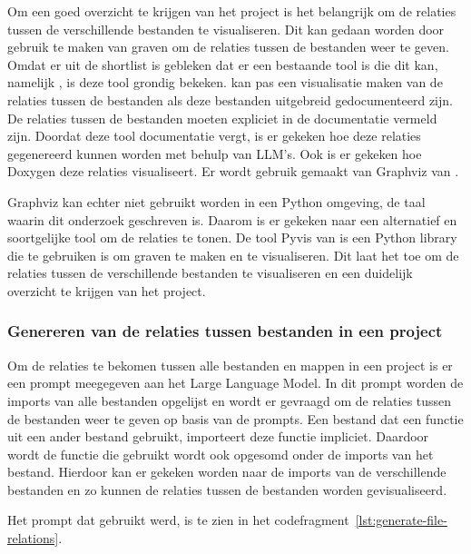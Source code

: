 Om een goed overzicht te krijgen van het project is het belangrijk om de relaties tussen de verschillende bestanden te visualiseren.
Dit kan gedaan worden door gebruik te maken van graven om de relaties tussen de bestanden weer te geven.
Omdat er uit de shortlist is gebleken dat er een bestaande tool is die dit kan, namelijk \textcite{Doxygen2023}, is deze tool grondig bekeken.
\textcite{Doxygen2023} kan pas een visualisatie maken van de relaties tussen de bestanden als deze bestanden uitgebreid gedocumenteerd zijn. 
De relaties tussen de bestanden moeten expliciet in de documentatie vermeld zijn.
Doordat deze tool documentatie vergt, is er gekeken hoe deze relaties gegenereerd kunnen worden met behulp van LLM's.
Ook is er gekeken hoe Doxygen deze relaties visualiseert. Er wordt gebruik gemaakt van Graphviz van \textcite{GraphvizAuthors2024}.

Graphviz \autocite{GraphvizAuthors2024} kan echter niet gebruikt worden in een Python omgeving, de taal waarin dit onderzoek geschreven is.
Daarom is er gekeken naar een alternatief en soortgelijke tool om de relaties te tonen.
De tool Pyvis van \textcite{WHIR2018} is een Python library die te gebruiken is om graven te maken en te visualiseren.
Dit laat het toe om de relaties tussen de verschillende bestanden te visualiseren en een duidelijk overzicht te krijgen van het project.

\subsubsection{Genereren van de relaties tussen bestanden in een project}
\label{subsec:project-documentatie-relaties-genereren}

Om de relaties te bekomen tussen alle bestanden en mappen in een project is er een prompt meegegeven aan het Large Language Model.
In dit prompt worden de imports van alle bestanden opgelijst en wordt er gevraagd om de relaties tussen de bestanden weer te geven op basis van de prompts.
Een bestand dat een functie uit een ander bestand gebruikt, importeert deze functie impliciet. 
Daardoor wordt de functie die gebruikt wordt ook opgesomd onder de imports van het bestand.
Hierdoor kan er gekeken worden naar de imports van de verschillende bestanden en zo kunnen de relaties tussen de bestanden worden gevisualiseerd.

Het prompt dat gebruikt werd, is te zien in het codefragment~\ref{lst:generate-file-relations}.

